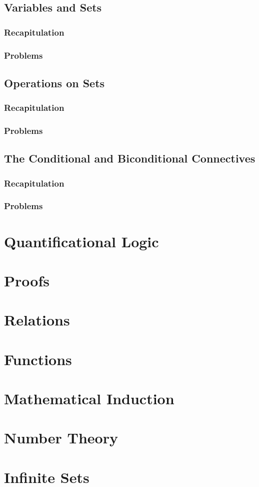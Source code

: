 \documentclass{report}
\begin{document}
    \section{Variables and Sets}
        \subsection{Recapitulation}
        
        \subsection{Problems}
        
    \section{Operations on Sets}
        \subsection{Recapitulation}
        
        \subsection{Problems}
        
    \section{The Conditional and Biconditional Connectives}
        \subsection{Recapitulation}
        
        \subsection{Problems}
        

\chapter{Quantificational Logic}
\chapter{Proofs}
\chapter{Relations}
\chapter{Functions}
\chapter{Mathematical Induction}
\chapter{Number Theory}
\chapter{Infinite Sets}
\end{document}
